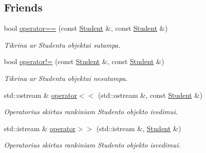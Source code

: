 \subsection*{Friends}
\begin{DoxyCompactItemize}
\item 
\mbox{\label{class_student_a0942ae3400d9d2365e5b563bb72ccfb6}} 
bool \mbox{\hyperlink{class_student_a0942ae3400d9d2365e5b563bb72ccfb6}{operator==}} (const \mbox{\hyperlink{class_student}{Student}} \&, const \mbox{\hyperlink{class_student}{Student}} \&)
\begin{DoxyCompactList}\small\item\em Tikrina ar Studentu objektai sutampa. \end{DoxyCompactList}\item 
\mbox{\label{class_student_a13c0f8ec52693be9891b40e6988ee558}} 
bool \mbox{\hyperlink{class_student_a13c0f8ec52693be9891b40e6988ee558}{operator!=}} (const \mbox{\hyperlink{class_student}{Student}} \&, const \mbox{\hyperlink{class_student}{Student}} \&)
\begin{DoxyCompactList}\small\item\em Tikrina ar Studentu objektai nesutampa. \end{DoxyCompactList}\item 
\mbox{\label{class_student_a114f2b27223a1624fc5dba036e8eff03}} 
std\+::ostream \& \mbox{\hyperlink{class_student_a114f2b27223a1624fc5dba036e8eff03}{operator$<$$<$}} (std\+::ostream \&, const \mbox{\hyperlink{class_student}{Student}} \&)
\begin{DoxyCompactList}\small\item\em Operatorius skirtas rankiniam Studento objekto ivedimui. \end{DoxyCompactList}\item 
\mbox{\label{class_student_a5bbf113a2041fb7a97690e1809263abd}} 
std\+::istream \& \mbox{\hyperlink{class_student_a5bbf113a2041fb7a97690e1809263abd}{operator$>$$>$}} (std\+::istream \&, \mbox{\hyperlink{class_student}{Student}} \&)
\begin{DoxyCompactList}\small\item\em Operatorius skirtas rankiniam Studento objekto isvedimui. \end{DoxyCompactList}\end{DoxyCompactItemize}
